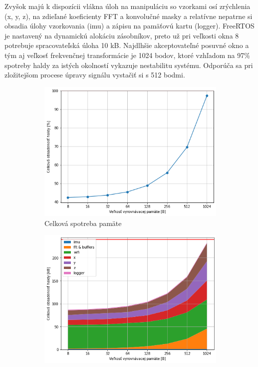 Zvyšok majú k dispozícii vlákna úloh na manipuláciu so vzorkami osí zrýchlenia (x, y, z), na zdieľané koeficienty FFT a
konvolučné masky a  relatívne nepatrne si obsadia úlohy vzorkovania (imu) a zápisu na pamäťovú kartu (logger).
FreeRTOS je nastavený na dynamickú alokáciu zásobníkov, preto už pri veľkosti okna 8 potrebuje spracovateľská úloha 10 kB. Najdlhšie
akceptovateľné posuvné okno a tým aj veľkosť frekvenčnej transformácie je 1024 bodov, ktoré vzhľadom na 97\% spotreby haldy za istých
okolností vykazuje nestabilitu systému. Odporúča sa pri zložitejšom procese úpravy signálu vystačiť si s 512 bodmi.

\begin{figure}[h]
	\centering
     \hfill
     \begin{subfigure}{0.48\textwidth}
        \centering
     	\includegraphics[width=\textwidth]{figures/verification/memory-usage-percentage.png}
     	 \caption{Celková spotreba pamäte}
     	 \label{graph:mem-usage}
     \end{subfigure}
     \hfill
      \begin{subfigure}{0.48\textwidth}
    	\centering
        \includegraphics[width=\textwidth]{figures/verification/memory-profile-bytes.png}

\end{subfigure}
\end{figure}
